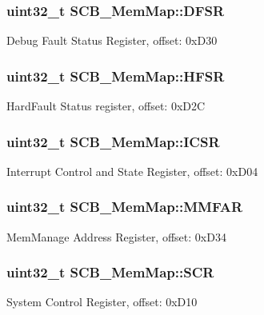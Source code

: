 \subsubsection[{D\+F\+S\+R}]{\setlength{\rightskip}{0pt plus 5cm}uint32\+\_\+t S\+C\+B\+\_\+\+Mem\+Map\+::\+D\+F\+S\+R}\label{struct_s_c_b___mem_map_af178d6003a18eb7452c51edcec14ec5d}
Debug Fault Status Register, offset\+: 0x\+D30 \hypertarget{struct_s_c_b___mem_map_a7f0b5d6f24446f1f603a6d9ef6259de2}{}
\subsubsection[{H\+F\+S\+R}]{\setlength{\rightskip}{0pt plus 5cm}uint32\+\_\+t S\+C\+B\+\_\+\+Mem\+Map\+::\+H\+F\+S\+R}\label{struct_s_c_b___mem_map_a7f0b5d6f24446f1f603a6d9ef6259de2}
Hard\+Fault Status register, offset\+: 0x\+D2\+C \hypertarget{struct_s_c_b___mem_map_aafbaa0d0a4b79969877c9b84be8aaf7a}{}
\subsubsection[{I\+C\+S\+R}]{\setlength{\rightskip}{0pt plus 5cm}uint32\+\_\+t S\+C\+B\+\_\+\+Mem\+Map\+::\+I\+C\+S\+R}\label{struct_s_c_b___mem_map_aafbaa0d0a4b79969877c9b84be8aaf7a}
Interrupt Control and State Register, offset\+: 0x\+D04 \hypertarget{struct_s_c_b___mem_map_af81b60a951ac45ddc8376500ed1580ef}{}
\subsubsection[{M\+M\+F\+A\+R}]{\setlength{\rightskip}{0pt plus 5cm}uint32\+\_\+t S\+C\+B\+\_\+\+Mem\+Map\+::\+M\+M\+F\+A\+R}\label{struct_s_c_b___mem_map_af81b60a951ac45ddc8376500ed1580ef}
Mem\+Manage Address Register, offset\+: 0x\+D34 \hypertarget{struct_s_c_b___mem_map_ac8d0a0d974bde944d42429065dd2f44a}{}
\subsubsection[{S\+C\+R}]{\setlength{\rightskip}{0pt plus 5cm}uint32\+\_\+t S\+C\+B\+\_\+\+Mem\+Map\+::\+S\+C\+R}\label{struct_s_c_b___mem_map_ac8d0a0d974bde944d42429065dd2f44a}
System Control Register, offset\+: 0x\+D10 \hypertarget{struct_s_c_b___mem_map_ae2b73d4b9744b878527466ec57dbfdb7}{}
